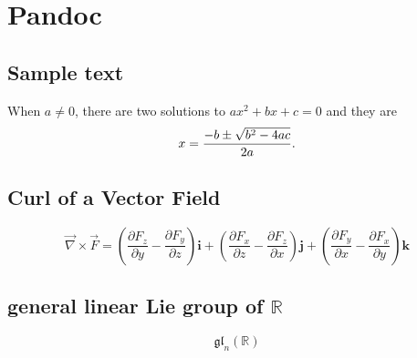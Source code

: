 \documentclass{article}
\begin{document}
\section*{Pandoc}
\subsection*{Sample text}
When \(a \ne 0\), there are two solutions to \(ax^2 + bx + c = 0\) and they are
\[x = {-b \pm \sqrt{b^2-4ac} \over 2a}.\]
\subsection*{Curl of a Vector Field}
\[
	\vec{\nabla} \times \vec{F}
	= \left( \frac{\partial F_z}{\partial y} - \frac{\partial F_y}{\partial z} \right) \mathbf{i}
	+ \left( \frac{\partial F_x}{\partial z} - \frac{\partial F_z}{\partial x} \right) \mathbf{j}
	+ \left( \frac{\partial F_y}{\partial x} - \frac{\partial F_x}{\partial y} \right) \mathbf{k}
\]
\subsection*{general linear Lie group of \(\mathbb{R}\)}
\[\mathfrak{gl}_n(\mathbb{R})\]
\end{document}
